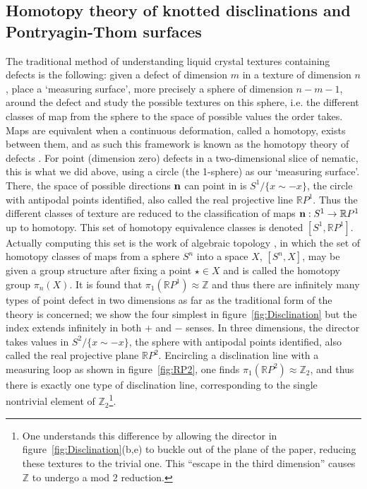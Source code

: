 \subsection{Homotopy theory of knotted disclinations and Pontryagin-Thom surfaces}
\label{subsec:HomotopyTheory}
The traditional method of understanding liquid crystal textures containing defects is the following: given a defect of dimension $m$ in a texture of dimension $n$, place a `measuring surface', more precisely a sphere of dimension $n-m-1$, around the defect and study the possible textures on this sphere, i.e. the different classes of map from the sphere to the space of possible values the order takes. Maps are equivalent when a continuous deformation, called a homotopy, exists between them, and as such this framework is known as the homotopy theory of defects \citep{Mermin1979,Alexander2012}. For point (dimension zero) defects in a two-dimensional slice of nematic, this is what we did above, using a circle (the 1-sphere) as our `measuring surface'. There, the space of possible directions $\bf n$ can point in is $S^1/\{x\sim-x\}$, the circle with antipodal points identified, also called the real projective line $\mathbb{R}P^1$. Thus the different classes of texture are reduced to the classification of maps ${\bf n}:S^1 \rightarrow \mathbb{R}P^1$ up to homotopy. This set of homotopy equivalence classes is denoted $[S^1,\mathbb{R}P^1]$. Actually computing this set is the work of algebraic topology \citep{Hatcher2012}, in which the set of homotopy classes of maps from a sphere $S^n$ into a space $X$, $[S^n,X]$, may be given a group structure after fixing a point $\star \in X$ and is called the homotopy group $\pi_n(X)$. It is found that $\pi_1(\mathbb{R}P^1) \approx \mathbb{Z}$ and thus there are infinitely many types of point defect in two dimensions as far as the traditional form of the theory is concerned; we show the four simplest in figure~\ref{fig:Disclination} but the index extends infinitely in both $+$ and $-$ senses. In three dimensions, the director takes values in $S^2/\{x\sim-x\}$, the sphere with antipodal points identified, also called the real projective plane $\mathbb{R}P^2$. Encircling a disclination line with a measuring loop as shown in figure~\ref{fig:RP2}, one finds $\pi_1(\mathbb{R}P^2) \approx \mathbb{Z}_2$, and thus there is exactly one type of disclination line, corresponding to the single nontrivial element of $\mathbb{Z}_2$\footnote{ One understands this difference by allowing the director in figure~\ref{fig:Disclination}(b,e) to buckle out of the plane of the paper, reducing these textures to the trivial one. This ``escape in the third dimension'' causes $\mathbb{Z}$ to undergo a mod 2 reduction.}.
